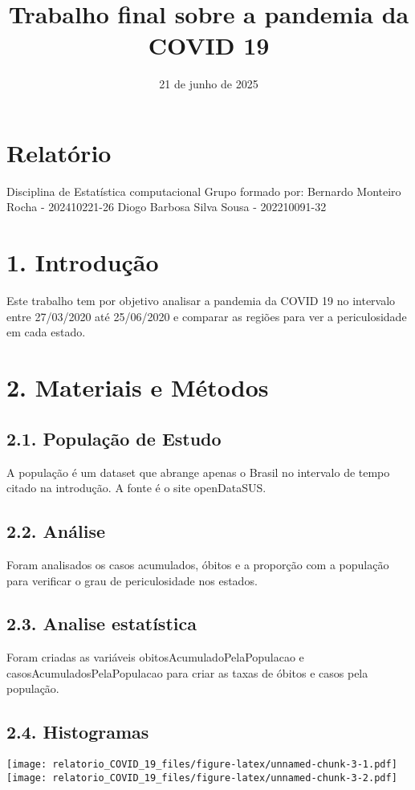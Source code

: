 \documentclass[
]{article}
\title{Trabalho final sobre a pandemia da COVID 19}
\author{}
\date{\vspace{-2.5em}21 de junho de 2025}
\begin{document}
\maketitle

\section{Relatório}\label{relatuxf3rio}

Disciplina de Estatística computacional Grupo formado por: Bernardo
Monteiro Rocha - 202410221-26 Diogo Barbosa Silva Sousa - 202210091-32

\section{1. Introdução}\label{introduuxe7uxe3o}

Este trabalho tem por objetivo analisar a pandemia da COVID 19 no
intervalo entre 27/03/2020 até 25/06/2020 e comparar as regiões para ver
a periculosidade em cada estado.

\section{2. Materiais e Métodos}\label{materiais-e-muxe9todos}

\subsection{2.1. População de Estudo}\label{populauxe7uxe3o-de-estudo}

A população é um dataset que abrange apenas o Brasil no intervalo de
tempo citado na introdução. A fonte é o site openDataSUS.

\subsection{2.2. Análise}\label{anuxe1lise}

Foram analisados os casos acumulados, óbitos e a proporção com a
população para verificar o grau de periculosidade nos estados.

\subsection{2.3. Analise estatística}\label{analise-estatuxedstica}

Foram criadas as variáveis obitosAcumuladoPelaPopulacao e
casosAcumuladosPelaPopulacao para criar as taxas de óbitos e casos pela
população.

\subsection{2.4. Histogramas}\label{histogramas}

\texttt{[image: relatorio\_COVID\_19\_files/figure-latex/unnamed-chunk-3-1.pdf]}
\texttt{[image: relatorio\_COVID\_19\_files/figure-latex/unnamed-chunk-3-2.pdf]}
\end{document}
